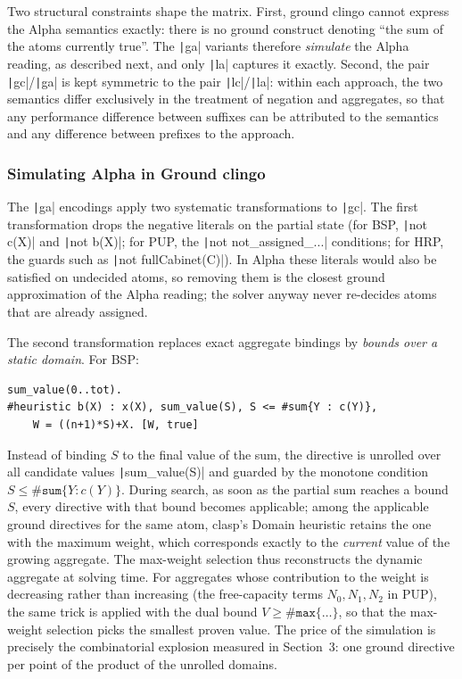 Two structural constraints shape the matrix. First, ground clingo cannot express the Alpha semantics exactly: there is no ground construct denoting \enquote{the sum of the atoms currently true}. The \texttt|ga| variants therefore \emph{simulate} the Alpha reading, as described next, and only \texttt|la| captures it exactly. Second, the pair \texttt|gc|/\texttt|ga| is kept symmetric to the pair \texttt|lc|/\texttt|la|: within each approach, the two semantics differ exclusively in the treatment of negation and aggregates, so that any performance difference between suffixes can be attributed to the semantics and any difference between prefixes to the approach.

\subsubsection{Simulating Alpha in Ground clingo}
\label{sec:ga-simulation}

The \texttt|ga| encodings apply two systematic transformations to \texttt|gc|. The first transformation drops the negative literals on the partial state (for BSP, \texttt|not c(X)| and \texttt|not b(X)|; for PUP, the \texttt|not not_assigned_...| conditions; for HRP, the guards such as \texttt|not fullCabinet(C)|). In Alpha these literals would also be satisfied on undecided atoms, so removing them is the closest ground approximation of the Alpha reading; the solver anyway never re-decides atoms that are already assigned.

The second transformation replaces exact aggregate bindings by \emph{bounds over a static domain}. For BSP:

\begin{verbatim}
sum_value(0..tot).
#heuristic b(X) : x(X), sum_value(S), S <= #sum{Y : c(Y)},
    W = ((n+1)*S)+X. [W, true]
\end{verbatim}

Instead of binding $S$ to the final value of the sum, the directive is unrolled over all candidate values \texttt|sum_value(S)| and guarded by the monotone condition $S \le \#\mathtt{sum}\{Y : c(Y)\}$. During search, as soon as the partial sum reaches a bound $S$, every directive with that bound becomes applicable; among the applicable ground directives for the same atom, clasp's Domain heuristic retains the one with the maximum weight, which corresponds exactly to the \emph{current} value of the growing aggregate. The max-weight selection thus reconstructs the dynamic aggregate at solving time. For aggregates whose contribution to the weight is decreasing rather than increasing (the free-capacity terms $N_0,N_1,N_2$ in PUP), the same trick is applied with the dual bound $V \ge \#\mathtt{max}\{\ldots\}$, so that the max-weight selection picks the smallest proven value. The price of the simulation is precisely the combinatorial explosion measured in Section~3: one ground directive per point of the product of the unrolled domains.

